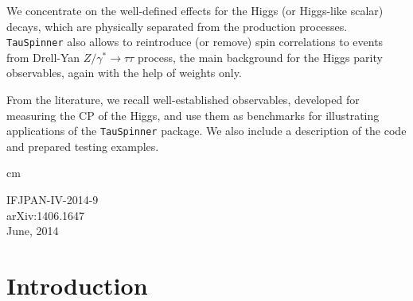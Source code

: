 \documentclass[12pt]{article}
\begin{document}
\begin{titlepage}
We concentrate on the well-defined  
effects for the Higgs (or Higgs-like scalar) decays, which are physically separated from the
production processes. 
{\tt TauSpinner}  also
allows to reintroduce (or remove) spin correlations  to events from Drell-Yan 
$Z/\gamma^* \to \tau \tau$ process, the main background for the Higgs parity 
observables, again with the help of weights only. 

From the literature, we recall well-established observables, developed for 
measuring the CP of the Higgs,
 and use them as benchmarks for illustrating applications 
of the {\tt TauSpinner} package.  
We also include a description of the code and prepared testing examples. 








 cm



\vspace{0.2 cm}
 
 \vspace{1cm}
\begin{flushleft}
{   IFJPAN-IV-2014-9\\ 	arXiv:1406.1647 \\
 June, 2014}
\end{flushleft}
 
\vspace*{1mm}
\bigskip
\noindent
{\footnotesize \noindent%
}
\end{titlepage}



\section{Introduction}
\end{document}
